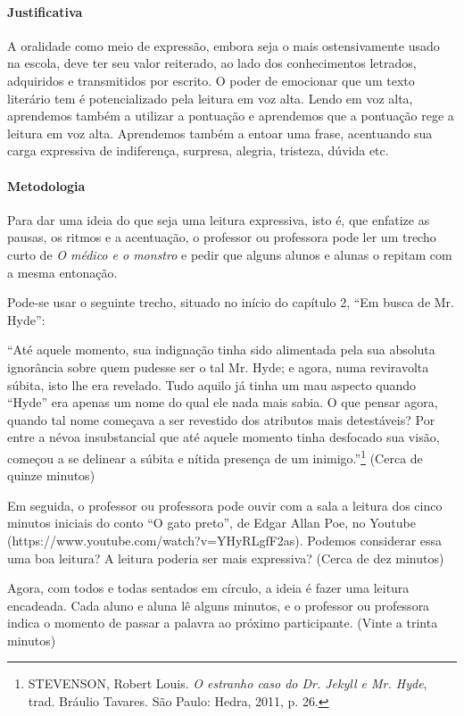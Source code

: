 \documentclass[12pt]{extarticle}
\begin{document}
\paragraph{Justificativa}
A oralidade como meio de expressão, embora seja o mais ostensivamente
usado na escola, deve ter seu valor reiterado, ao lado dos conhecimentos
letrados, adquiridos e transmitidos por escrito. O poder de emocionar
que um texto literário tem é potencializado pela leitura em voz alta.
Lendo em voz alta, aprendemos também a utilizar a pontuação e aprendemos
que a pontuação rege a leitura em voz alta. Aprendemos também a entoar
uma frase, acentuando sua carga expressiva de indiferença, surpresa,
alegria, tristeza, dúvida etc.

\paragraph{Metodologia}
Para dar uma ideia do que seja uma leitura expressiva, isto é, que
enfatize as pausas, os ritmos e a acentuação, o professor ou professora
pode ler um trecho curto de \emph{O médico e o monstro} e pedir que
alguns alunos e alunas o repitam com a mesma entonação.

Pode-se usar o seguinte trecho, situado no início do capítulo 2, ``Em
busca de Mr. Hyde'':

``Até aquele momento, sua indignação tinha sido alimentada pela sua
absoluta ignorância sobre quem pudesse ser o tal Mr. Hyde; e agora, numa
reviravolta súbita, isto lhe era revelado. Tudo aquilo já tinha um mau
aspecto quando ``Hyde'' era apenas um nome do qual ele nada mais sabia.
O que pensar agora, quando tal nome começava a ser revestido dos
atributos mais detestáveis? Por entre a névoa insubstancial que até
aquele momento tinha desfocado sua visão, começou a se delinear a súbita
e nítida presença de um inimigo.''\footnote{STEVENSON, Robert Louis.
  \emph{O estranho caso do Dr. Jekyll e Mr. Hyde}, trad. Bráulio
  Tavares. São Paulo: Hedra, 2011, p. 26.}
(Cerca de quinze minutos)

Em seguida, o professor ou professora pode ouvir com a sala a leitura
dos cinco minutos iniciais do conto ``O gato preto'', de Edgar Allan
Poe, no Youtube (https://www.youtube.com/watch?v=YHyRLgfF2as). Podemos
considerar essa uma boa leitura? A leitura poderia ser mais expressiva?
(Cerca de dez minutos)

Agora, com todos e todas sentados em círculo, a ideia é fazer uma
leitura encadeada. Cada aluno e aluna lê alguns minutos, e o professor
ou professora indica o momento de passar a palavra ao próximo
participante.
(Vinte a trinta minutos)
\end{document}
